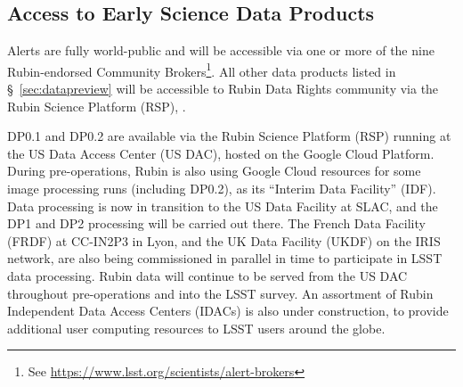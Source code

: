 \subsection{Access to Early Science  Data Products} \label{ssec:dataaccess}
Alerts are fully world-public and will be accessible via one or more of the nine Rubin-endorsed Community Brokers\footnote{See \url{https://www.lsst.org/scientists/alert-brokers}}.
All other data products listed in \S~\ref{sec:datapreview} will be accessible to Rubin Data Rights community via the Rubin Science Platform (RSP), .

DP0.1 and DP0.2 are available via the Rubin Science Platform (RSP) running at the US Data Access Center (US DAC), hosted on the Google Cloud Platform.
During pre-operations, Rubin is also using Google Cloud resources for some image processing runs (including DP0.2), as its ``Interim Data Facility'' (IDF).
Data processing is now in transition to the US Data Facility at SLAC, and the DP1 and DP2 processing will be carried out there.
The French Data Facility (FRDF) at CC-IN2P3 in Lyon, and the UK Data Facility (UKDF) on the IRIS network, are also being commissioned in parallel in time to participate in LSST data processing.
Rubin data will continue to be served from the US DAC throughout pre-operations and into the LSST survey.
An assortment of Rubin Independent Data Access Centers (IDACs) is also under construction, to provide additional user computing resources to LSST users around the globe.

